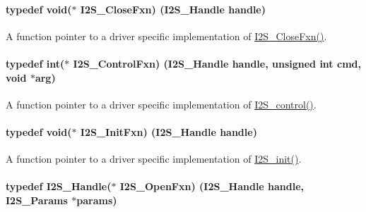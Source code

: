 \paragraph[{I2\+S\+\_\+\+Close\+Fxn}]{\setlength{\rightskip}{0pt plus 5cm}typedef void($\ast$ I2\+S\+\_\+\+Close\+Fxn) ({\bf I2\+S\+\_\+\+Handle} handle)}\label{_i2_s_8h_a91bfa91197cb8ff2388744088177dde8}


A function pointer to a driver specific implementation of \hyperlink{_i2_s_8h_a91bfa91197cb8ff2388744088177dde8}{I2\+S\+\_\+\+Close\+Fxn()}. 

\paragraph[{I2\+S\+\_\+\+Control\+Fxn}]{\setlength{\rightskip}{0pt plus 5cm}typedef int($\ast$ I2\+S\+\_\+\+Control\+Fxn) ({\bf I2\+S\+\_\+\+Handle} handle, unsigned int cmd, void $\ast$arg)}\label{_i2_s_8h_aec416642887dbc181166c479a79c5615}


A function pointer to a driver specific implementation of \hyperlink{_i2_s_8h_a1af19b22e9036bee696b4e4efe4916b0}{I2\+S\+\_\+control()}. 

\paragraph[{I2\+S\+\_\+\+Init\+Fxn}]{\setlength{\rightskip}{0pt plus 5cm}typedef void($\ast$ I2\+S\+\_\+\+Init\+Fxn) ({\bf I2\+S\+\_\+\+Handle} handle)}\label{_i2_s_8h_a17f21fcbc2627ef97044ee7ff6cfdee6}


A function pointer to a driver specific implementation of \hyperlink{_i2_s_8h_a79e8fdf40ee80c49b2cac09a3e428a82}{I2\+S\+\_\+init()}. 

\paragraph[{I2\+S\+\_\+\+Open\+Fxn}]{\setlength{\rightskip}{0pt plus 5cm}typedef {\bf I2\+S\+\_\+\+Handle}($\ast$ I2\+S\+\_\+\+Open\+Fxn) ({\bf I2\+S\+\_\+\+Handle} handle, {\bf I2\+S\+\_\+\+Params} $\ast$params)}\label{_i2_s_8h_a0a8c4787b4a5a262dc86d9dfa7da2840}



